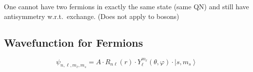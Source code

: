 \newpar{}

One cannot have two fermions in exactly the same state (same QN) and still have antisymmetry w.r.t.\ exchange.
(Does not apply to bosons)
\subsection{Wavefunction for Fermions}
\noindent\begin{equation*}
    \psi_{n,\ell,m_\ell,m_s} = A\cdot R_{n\ell}(r)\cdot Y_\ell^{m_\ell}(\theta, \varphi) \cdot \left|s,m_s \right\rangle
\end{equation*}